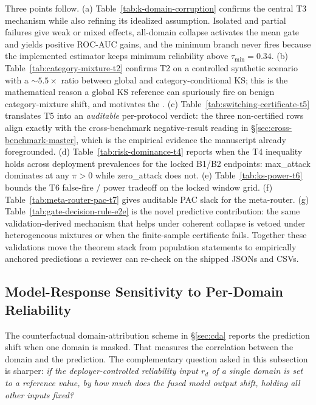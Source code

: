 \documentclass[10pt,conference]{IEEEtran}
\begin{document}
Three points follow. (a) Table~\ref{tab:k-domain-corruption} confirms the
central T3 mechanism while also refining its idealized assumption. Isolated
and partial failures give weak or mixed effects, all-domain collapse activates
the mean gate and yields positive ROC-AUC gains, and the minimum branch never
fires because the implemented estimator keeps minimum reliability above
$\tau_{\min}=0.34$. (b)
Table~\ref{tab:category-mixture-t2} confirms T2 on a controlled
synthetic scenario with a $\sim$$5.5\times$ ratio between global and
category-conditional KS; this is the mathematical reason a global KS
reference can spuriously fire on benign category-mixture shift, and
motivates the . (c)
Table~\ref{tab:switching-certificate-t5} translates T5 into an
\emph{auditable} per-protocol verdict: the three non-certified rows
align exactly with the cross-benchmark negative-result reading in
§\ref{sec:cross-benchmark-master}, which is the empirical evidence
the manuscript already foregrounded. (d)
Table~\ref{tab:risk-dominance-t4} reports when the T4 inequality holds
across deployment prevalences for the locked B1/B2 endpoints: max\_attack
dominates at any $\pi>0$ while zero\_attack does not. (e)
Table~\ref{tab:ks-power-t6} bounds the T6 false-fire / power tradeoff
on the locked window grid. (f)
Table~\ref{tab:meta-router-pac-t7} gives auditable PAC slack for the
meta-router. (g)
Table~\ref{tab:gate-decision-rule-e2e} is the novel predictive
contribution: the same validation-derived mechanism that helps under
coherent collapse is vetoed under heterogeneous mixtures or when the
finite-sample certificate fails. Together these validations move the
theorem stack from population statements to empirically anchored
predictions a reviewer can re-check on the shipped JSONs and CSVs.

\subsection{Model-Response Sensitivity to Per-Domain Reliability}
\label{sec:causal-attribution}

The counterfactual domain-attribution scheme in §\ref{sec:cda} reports
the prediction shift when one domain is masked. That measures the
correlation between the domain and the prediction. The complementary
question asked in this subsection is sharper: \emph{if the
deployer-controlled reliability input $r_d$ of a single domain is set
to a reference value, by how much does the fused model output shift,
holding all other inputs fixed?}
\end{document}
